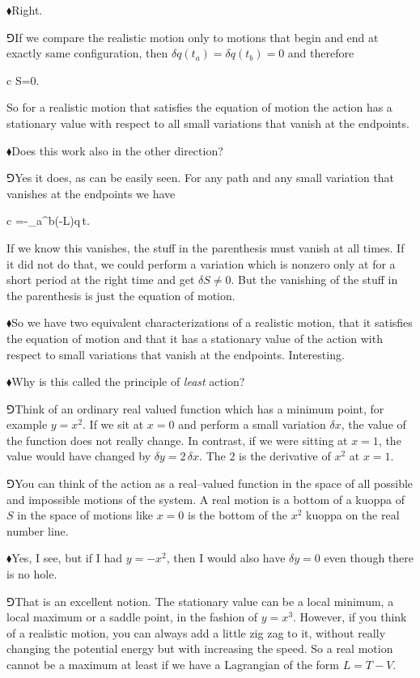 \documentclass[11pt,oneside%
]{memoir}
\newenvironment{eqna}{\begin{IEEEeqnarray*}{c}}{\end{IEEEeqnarray*}\ignorespacesafterend}
\newcommand{\dd}{\mathrm{d}}
\newcommand{\hea}{\(\blacklozenge\)\;}
\newcommand{\heb}{\(\Game\)\;}
\begin{document}
\hea Right.%

\heb If we compare the realistic motion only to motions that begin and end at exactly same configuration, then \(\delta q(t_a)=\delta q(t_b)=0\) and therefore
\begin{eqna}
    \delta S=0.
\end{eqna}
So for a realistic motion that satisfies the equation of motion the action has a stationary value with respect to all small variations that vanish at the endpoints.

\hea Does this work also in the other direction?

\heb Yes it does, as can be easily seen. For any path and any small variation that vanishes at the endpoints we have
\begin{eqna}
    \delta =-\int_a^b(-\nabla L)\cdot\delta q\,\dd t.
\end{eqna}
If we know this vanishes, the stuff in the parenthesis must vanish at all times. If it did not do that, we could perform a variation which is nonzero only at for a short period at the right time and get \(\delta S\neq 0\). But the vanishing of the stuff in the parenthesis is just the equation of motion.

\hea So we have two equivalent characterizations of a realistic motion, that it satisfies the equation of motion and that it has a stationary value of the action with respect to small variations that vanish at the endpoints. Interesting.

\hea Why is this called the principle of \emph{least} action?

\heb Think of an ordinary real valued function which has a minimum point, for example \(y=x^2\). If we sit at \(x=0\) and perform a small variation \(\delta x\), the value of the function does not really change. In contrast, if we were sitting at \(x=1\), the value would have changed by \(\delta y=2\,\delta x\). The \(2\) is the derivative of \(x^2\) at \(x=1\).

\heb You can think of the action as a real--valued function in the space of all possible and impossible motions of the system. A real motion is a bottom of a kuoppa of \(S\) in the space of motions like \(x=0\) is the bottom of the \(x^2\) kuoppa on the real number line.

\hea Yes, I see, but if I had \(y=-x^2\), then I would also have \(\delta y=0\) even though there is no hole.

\heb That is an excellent notion. The stationary value can be a local minimum, a local maximum or a saddle point, in the fashion of \(y=x^3\). However, if you think of a realistic motion, you can always add a little zig zag to it, without really changing the potential energy but with increasing the speed. So a real motion cannot be a maximum at least if we have a Lagrangian of the form \(L=T-V\).
\end{document}
